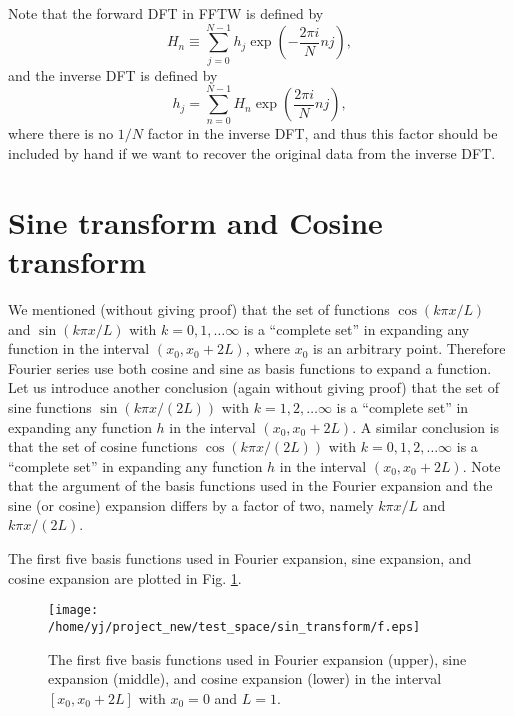 \documentclass{article}
\begin{document}
Note that the forward DFT in FFTW is defined by
\begin{equation}
  H_n \equiv \sum_{j = 0}^{N - 1} h_j \exp \left( - \frac{2 \pi i}{N} n j
  \right),
\end{equation}
and the inverse DFT is defined by
\begin{equation}
  h_j = \sum_{n = 0}^{N - 1} H_n \exp \left( \frac{2 \pi i}{N} n j \right),
\end{equation}
where there is no $1 / N$ factor in the inverse DFT, and thus this factor
should be included by hand if we want to recover the original data from the
inverse DFT.

\section{Sine transform and Cosine transform}

We mentioned (without giving proof) that the set of functions $\cos (k \pi x /
L)$ and $\sin (k \pi x / L)$ with $k = 0, 1, \ldots \infty$ is a ``complete
set'' in expanding any function in the interval $(x_0, x_0 + 2 L)$, where
$x_0$ is an arbitrary point. Therefore Fourier series use both cosine and sine
as basis functions to expand a function. Let us introduce another conclusion
(again without giving proof) that the set of sine functions $\sin (k \pi x /
(2 L))$ with $k = 1, 2, \ldots \infty$ is a ``complete set'' in expanding any
function $h$ in the interval $(x_0, x_0 + 2 L)$. A similar conclusion is that
the set of cosine functions $\cos (k \pi x / (2 L))$ with $k = 0, 1, 2, \ldots
\infty$ is a ``complete set'' in expanding any function $h$ in the interval
$(x_0, x_0 + 2 L)$. Note that the argument of the basis functions used in the
Fourier expansion and the sine (or cosine) expansion differs by a factor of
two, namely $k \pi x / L$ and $k \pi x / (2 L)$.

The first five basis functions used in Fourier expansion, sine expansion, and
cosine expansion are plotted in Fig. \ref{18-1-10-e1}.

\begin{figure}[h]
  \texttt{[image: /home/yj/project\_new/test\_space/sin\_transform/f.eps]}
  \caption{ \label{18-1-10-e1}The first five basis functions used in Fourier
  expansion (upper), sine expansion (middle), and cosine expansion (lower) in
  the interval $[x_0, x_0 + 2 L]$ with $x_0 = 0$ and $L = 1$.}
\end{figure}

\

\
\end{document}
